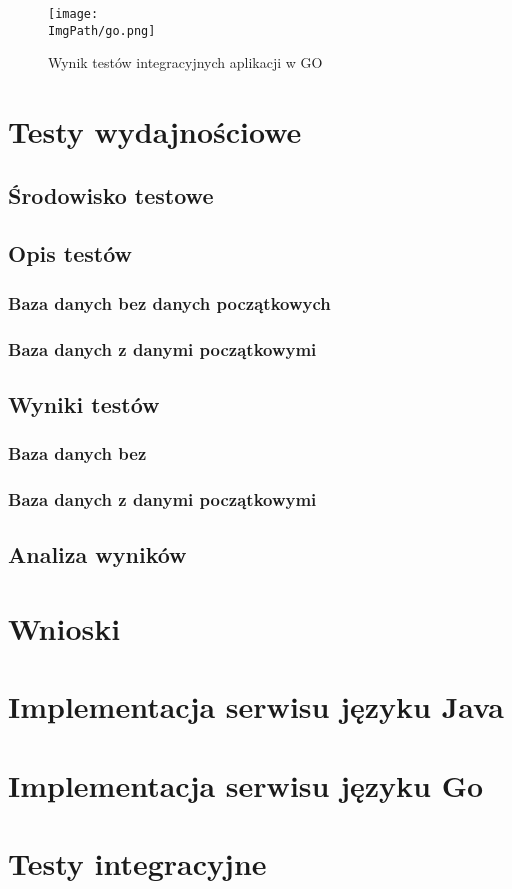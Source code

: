 \documentclass[a4paper,12pt,twoside,openany]{report}
\newcommand{\ImgPath}{img}
\begin{document}
\newpage
\begin{figure}
\centering
\hspace*{-3,5cm}
\texttt{[image: \\ImgPath/go.png]}
\caption{Wynik testów integracyjnych aplikacji w GO}
\label{rlexample}
\end{figure}

\chapter{Testy wydajnościowe}
\section{Środowisko testowe}
\section{Opis testów}
\subsection{Baza danych bez danych początkowych}
\subsection{Baza danych z danymi początkowymi}

\section{Wyniki testów}
\subsection{Baza danych bez}
\subsection{Baza danych z danymi początkowymi}
\section{Analiza wyników}

\chapter{Wnioski}

\appendix
\chapter{Implementacja serwisu języku Java}
\chapter{Implementacja serwisu języku Go}
\chapter{Testy integracyjne}

\begin{thebibliography}{99}

\end{thebibliography}

\zakonczenie  %
\end{document}
